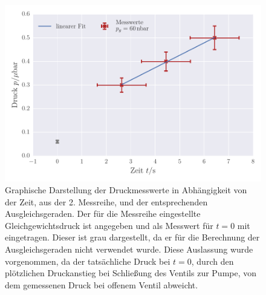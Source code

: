 \begin{figure}[!h]
 \centering
 \includegraphics[scale=0.65]{../Grafiken/Leckrate_Turbo_1.pdf}	
 \caption{Graphische Darstellung der Druckmesswerte in Abhängigkeit von der Zeit, aus der 2. Messreihe, und der
 	entsprechenden Ausgleichsgeraden. Der für die Messreihe eingestellte Gleichgewichtsdruck ist angegeben und als Messwert für $t=0$ mit eingetragen. Dieser ist grau dargestellt, da er für die 
 	Berechnung der Ausgleichsgeraden nicht verwendet wurde. Diese Auslassung wurde vorgenommen, da
 	der tatsächliche Druck bei $t=0$, durch den plötzlichen Druckanstieg bei Schließung des Ventils zur Pumpe, von dem
 	gemessenen Druck bei offenem Ventil abweicht.  \label{fig:leckrate_turbo_1}}
 \end{figure} 